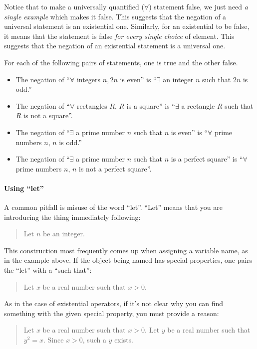 \documentclass{tufte-book}
\begin{document}
Notice that to make a universally quantified ($\forall$) statement false, we just need \emph{a single example} which makes it false. This suggests that the negation of a universal statement is an existential one. Similarly, for an existential to be false, it means that the statement is false \emph{for every single choice} of element. This suggests that the negation of an existential statement is a universal one.
\begin{example}
  For each of the following pairs of statements, one is true and the other false.
\begin{itemize}
    \item The negation of ``$\forall$ integers $n, 2n$ is even'' is ``$\exists$
  an integer $n$ such that $2n$ is odd.''
    \item The negation of ``$\forall$ rectangles $R$, $R$ is a square'' is
  ``$\exists$ a rectangle $R$ such that $R$ is not a square''.
    \item The negation of ``$\exists$ a prime number $n$ such that $n$ is
  even'' is ``$\forall$ prime numbers $n$, $n$ is odd.''
    \item The negation of ``$\exists$ a prime number $n$ such that $n$ is
  a perfect square'' is ``$\forall$ prime numbers $n$, $n$ is not a
  perfect square''.
\end{itemize}
\end{example}

\paragraph{Using ``let''}
\label{sec:using-let}

A common pitfall is misuse of the word ``let''. ``Let'' means that you are introducing the thing immediately following:
\begin{quote}
  Let $n$ be an integer.
\end{quote}
This construction most frequently comes up when assigning a variable name, as in the example above. If the object being named has special properties, one pairs the ``let'' with a ``such that'':
\begin{quote}
  Let $x$ be a real number such that $x > 0$. 
\end{quote}
As in the case of existential operators, if it's not clear why you can find something with the given special property, you must provide a reason:
\begin{quote}
  Let $x$ be a real number such that $x > 0$. Let $y$ be a real number such that $y^2 = x$. Since $x > 0$, such a $y$ exists.
\end{quote}
\end{document}
